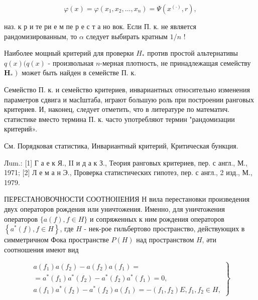 \documentclass[10pt]{article}
\begin{document}
\[

\varphi(x)=\varphi\left(x_{1}, x_{2}, \ldots, x_{n}\right)=\Psi\left(x^{(\cdot)}, r\right),

\]



наз. к р и те ри е м пе р е с т а но вок. Если П. к. не является рандомизированным, то $\alpha$ следует выбирать кратным $1 / n$ !



Наиболее мощный критерий для проверки $H_{*}$ против простой альтернативы $q(x)(q(x)$ - произвольная $n$-мерная плотность, не принадлежащая семейству $\left.\mathbf{H}_{*}\right)$ может быть найден в семействе П. к.



Семейство П. к. и семейство критериев, инвариантных относительно изменения параметров сдвига и масІштаба, играют большую роль при построении ранговых критериев. И, наконец, следует отметить, что в литературе по математич. статистике вместо термина П. к. часто употребляют термин "рандомизации критерий».



См. Порядковая статистика, Инвариантный критерий, Критическая бункция.



Лum.: [1] Г а е к Я., II и д а к З., Теория ранговых критериев, пер. с англ., М., 1971; [2] Л е м а н Э., Проверка статистических гипотез, пер. с англ., 2 изд., М., 1979.



ПЕРЕСТАНОВОЧНОСТИ СООТНОІІЕНИЯ Н вила перестановки произведения двух операторов рождения или уничтожения. Именно, для уничтожения операторов $\{a(f), f \in H\}$ и сопряженных к ним рождения операторов $\left\{a^{*}(f), f \in H\right\}$, где $H$ - нек-рое гильбертово пространство, действующих в симметричном Фока пространстве $P(H)$ над пространством $H$, әти соотношения имеют вид



\[

\left.\begin{array}{c}

a\left(f_{1}\right) a\left(f_{2}\right)-a\left(f_{2}\right) a\left(f_{1}\right)= \\

=a^{*}\left(f_{1}\right) a^{*}\left(f_{2}\right)-a^{*}\left(f_{2}\right) a^{*}\left(f_{1}\right)=0, \\

a\left(f_{1}\right) a^{*}\left(f_{2}\right)-a^{*}\left(f_{2}\right) a\left(f_{1}\right)=-\left(f_{1}, f_{2}\right) E, f_{1}, f_{2} \in H,

\end{array}\right\}

\]
\end{document}
